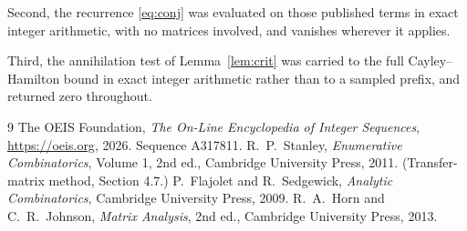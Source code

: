 \documentclass[11pt,a4paper]{article}
\theoremstyle{plain}
\theoremstyle{definition}
\begin{document}
Second, the recurrence \eqref{eq:conj} was evaluated on those published terms in exact
integer arithmetic, with no matrices involved, and vanishes wherever it applies.

Third, the annihilation test of Lemma~\ref{lem:crit} was carried to the full
Cayley--Hamilton bound in exact integer arithmetic rather than to a sampled prefix, and
returned zero throughout.

\begin{thebibliography}{9}
 The OEIS Foundation, \emph{The On-Line Encyclopedia of Integer
Sequences}, \url{https://oeis.org}, 2026. Sequence A317811.
 R.~P.~Stanley, \emph{Enumerative Combinatorics}, Volume 1, 2nd ed.,
Cambridge University Press, 2011. (Transfer-matrix method, Section 4.7.)
 P.~Flajolet and R.~Sedgewick, \emph{Analytic Combinatorics}, Cambridge
University Press, 2009.
 R.~A.~Horn and C.~R.~Johnson, \emph{Matrix Analysis}, 2nd ed., Cambridge
University Press, 2013.
\end{thebibliography}
\end{document}
